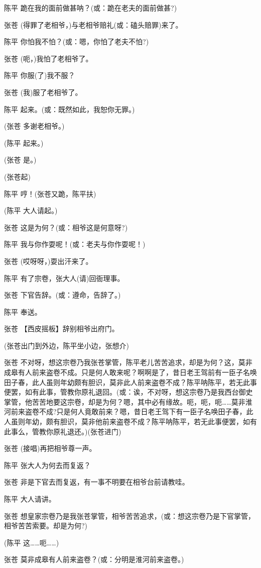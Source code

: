 陈平 跪在我的面前做甚呐？(或：跪在老夫的面前做甚?)

张苍 (得罪了老相爷，)与老相爷赔礼(或：磕头赔罪)来了。

陈平 你怕我不怕？(或：嗯，你怕了老夫不怕?)

张苍 (呃，)我怕了老相爷了。

陈平 你服(了)我不服？

张苍 (我)服了老相爷了。

陈平 起来。(或：既然如此，我恕你无罪。)

(张苍 多谢老相爷。)

(陈平 起来。)

(张苍 是。)

(张苍起)

陈平 哼！(张苍又跪，陈平扶)

(陈平 大人请起。)

张苍 这是为何？(或：相爷这是何意呀?)

陈平 我与你作耍呢！(或：老夫与你作耍呢！)

张苍 (哎呀呀，)耍出汗来了。

陈平 有了宗卷，张大人(请)回衙理事。

张苍 下官告辞。(或：遵命，告辞了。)

陈平 奉送。

张苍 【西皮摇板】辞别相爷出府门。

(张苍出门到外边，陈平坐小边，张想介)

张苍
不对呀，想这宗卷乃我张苍掌管，陈平老儿苦苦追求，却是为何？这，莫非成皋有人前来盗卷不成。只是何人敢来呢？啊啊是了，昔日老王驾前有一臣子名唤田子春，此人虽则年幼颇有胆识，莫非此人前来盗卷不成？陈平呐陈平，若无此事便罢，如有此事，管教你原礼退回。(或：诶，不对呀，想这宗卷乃是我西台御史掌管，他苦苦地要这宗卷，却是为何？嗯，其中必有缘故。呃，呃，呃\ldots{}\ldots{}莫非淮河前来盗卷不成?只是何人竟敢前来？嗯，昔日老王驾下有一臣子名唤田子春，此人虽则年幼，颇有胆识，莫非他前来盗卷不成？陈平呐陈平，若无此事便罢，如有此事么，管教你原礼退还。)(张苍进门)

张苍 (接唱)再把相爷尊一声。

陈平 张大人为何去而复返？

张苍 非是下官去而复返，有一事不明要在相爷台前请教哇。

陈平 大人请讲。

张苍
想皇家宗卷乃是我张苍掌管，相爷苦苦追求，(或：想这宗卷乃是下官掌管，相爷苦苦索要。却是为何?)

(陈平 这\ldots{}\ldots{}呃\ldots{}\ldots{})

张苍 莫非成皋有人前来盗卷？(或：分明是淮河前来盗卷。)

